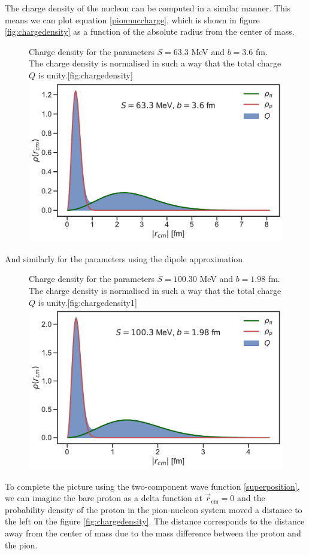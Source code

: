 The charge density of the nucleon can be computed in a similar manner. This means we can plot equation \eqref{pionnuccharge}, which is shown in figure \ref{fig:chargedensity} as a function of the absolute radius from the center of mass. 
\begin{figure}[H]
	\begin{sidecaption}{Charge density for the parameters $S=63.3$ MeV and $b=3.6$ fm. The charge density is normalised in such a way that the total charge $Q$ is unity.}[fig:chargedensity]
		\includegraphics[width=\linewidth]{Figures/ChargeDensityNeutronPlus1.pdf} 
	\end{sidecaption}
\end{figure}
And similarly for the parameters using the dipole approximation
\begin{figure}[H]
	\begin{sidecaption}{Charge density for the parameters $S=100.30$ MeV and $b=1.98$ fm. The charge density is normalised in such a way that the total charge $Q$ is unity.}[fig:chargedensity1]
		\includegraphics[width=\linewidth]{Figures/ChargeDensityNeutronPlus2.pdf} 
	\end{sidecaption}
\end{figure}
To complete the picture using the two-component wave function \eqref{superposition}, we can imagine the bare proton as a delta function at $\vec{r}_\text{cm}=0$ and the probability density of the proton in the pion-nucleon system moved a distance to the left on the figure \ref{fig:chargedensity}. The distance corresponds to the distance away from the center of mass due to the mass difference between the proton and the pion. 

